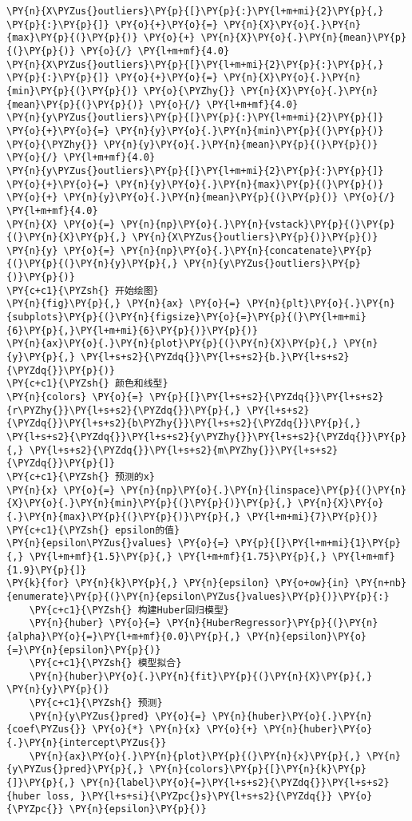 \begin{Verbatim}[commandchars=\\\{\}]
\PY{n}{X\PYZus{}outliers}\PY{p}{[}\PY{p}{:}\PY{l+m+mi}{2}\PY{p}{,} \PY{p}{:}\PY{p}{]} \PY{o}{+}\PY{o}{=} \PY{n}{X}\PY{o}{.}\PY{n}{max}\PY{p}{(}\PY{p}{)} \PY{o}{+} \PY{n}{X}\PY{o}{.}\PY{n}{mean}\PY{p}{(}\PY{p}{)} \PY{o}{/} \PY{l+m+mf}{4.0}
\PY{n}{X\PYZus{}outliers}\PY{p}{[}\PY{l+m+mi}{2}\PY{p}{:}\PY{p}{,} \PY{p}{:}\PY{p}{]} \PY{o}{+}\PY{o}{=} \PY{n}{X}\PY{o}{.}\PY{n}{min}\PY{p}{(}\PY{p}{)} \PY{o}{\PYZhy{}} \PY{n}{X}\PY{o}{.}\PY{n}{mean}\PY{p}{(}\PY{p}{)} \PY{o}{/} \PY{l+m+mf}{4.0}
\PY{n}{y\PYZus{}outliers}\PY{p}{[}\PY{p}{:}\PY{l+m+mi}{2}\PY{p}{]} \PY{o}{+}\PY{o}{=} \PY{n}{y}\PY{o}{.}\PY{n}{min}\PY{p}{(}\PY{p}{)} \PY{o}{\PYZhy{}} \PY{n}{y}\PY{o}{.}\PY{n}{mean}\PY{p}{(}\PY{p}{)} \PY{o}{/} \PY{l+m+mf}{4.0}
\PY{n}{y\PYZus{}outliers}\PY{p}{[}\PY{l+m+mi}{2}\PY{p}{:}\PY{p}{]} \PY{o}{+}\PY{o}{=} \PY{n}{y}\PY{o}{.}\PY{n}{max}\PY{p}{(}\PY{p}{)} \PY{o}{+} \PY{n}{y}\PY{o}{.}\PY{n}{mean}\PY{p}{(}\PY{p}{)} \PY{o}{/} \PY{l+m+mf}{4.0}
\PY{n}{X} \PY{o}{=} \PY{n}{np}\PY{o}{.}\PY{n}{vstack}\PY{p}{(}\PY{p}{(}\PY{n}{X}\PY{p}{,} \PY{n}{X\PYZus{}outliers}\PY{p}{)}\PY{p}{)}
\PY{n}{y} \PY{o}{=} \PY{n}{np}\PY{o}{.}\PY{n}{concatenate}\PY{p}{(}\PY{p}{(}\PY{n}{y}\PY{p}{,} \PY{n}{y\PYZus{}outliers}\PY{p}{)}\PY{p}{)}
\PY{c+c1}{\PYZsh{} 开始绘图}
\PY{n}{fig}\PY{p}{,} \PY{n}{ax} \PY{o}{=} \PY{n}{plt}\PY{o}{.}\PY{n}{subplots}\PY{p}{(}\PY{n}{figsize}\PY{o}{=}\PY{p}{(}\PY{l+m+mi}{6}\PY{p}{,}\PY{l+m+mi}{6}\PY{p}{)}\PY{p}{)}
\PY{n}{ax}\PY{o}{.}\PY{n}{plot}\PY{p}{(}\PY{n}{X}\PY{p}{,} \PY{n}{y}\PY{p}{,} \PY{l+s+s2}{\PYZdq{}}\PY{l+s+s2}{b.}\PY{l+s+s2}{\PYZdq{}}\PY{p}{)}
\PY{c+c1}{\PYZsh{} 颜色和线型}
\PY{n}{colors} \PY{o}{=} \PY{p}{[}\PY{l+s+s2}{\PYZdq{}}\PY{l+s+s2}{r\PYZhy{}}\PY{l+s+s2}{\PYZdq{}}\PY{p}{,} \PY{l+s+s2}{\PYZdq{}}\PY{l+s+s2}{b\PYZhy{}}\PY{l+s+s2}{\PYZdq{}}\PY{p}{,} \PY{l+s+s2}{\PYZdq{}}\PY{l+s+s2}{y\PYZhy{}}\PY{l+s+s2}{\PYZdq{}}\PY{p}{,} \PY{l+s+s2}{\PYZdq{}}\PY{l+s+s2}{m\PYZhy{}}\PY{l+s+s2}{\PYZdq{}}\PY{p}{]}
\PY{c+c1}{\PYZsh{} 预测的x}
\PY{n}{x} \PY{o}{=} \PY{n}{np}\PY{o}{.}\PY{n}{linspace}\PY{p}{(}\PY{n}{X}\PY{o}{.}\PY{n}{min}\PY{p}{(}\PY{p}{)}\PY{p}{,} \PY{n}{X}\PY{o}{.}\PY{n}{max}\PY{p}{(}\PY{p}{)}\PY{p}{,} \PY{l+m+mi}{7}\PY{p}{)}
\PY{c+c1}{\PYZsh{} epsilon的值}
\PY{n}{epsilon\PYZus{}values} \PY{o}{=} \PY{p}{[}\PY{l+m+mi}{1}\PY{p}{,} \PY{l+m+mf}{1.5}\PY{p}{,} \PY{l+m+mf}{1.75}\PY{p}{,} \PY{l+m+mf}{1.9}\PY{p}{]}
\PY{k}{for} \PY{n}{k}\PY{p}{,} \PY{n}{epsilon} \PY{o+ow}{in} \PY{n+nb}{enumerate}\PY{p}{(}\PY{n}{epsilon\PYZus{}values}\PY{p}{)}\PY{p}{:}
    \PY{c+c1}{\PYZsh{} 构建Huber回归模型}
    \PY{n}{huber} \PY{o}{=} \PY{n}{HuberRegressor}\PY{p}{(}\PY{n}{alpha}\PY{o}{=}\PY{l+m+mf}{0.0}\PY{p}{,} \PY{n}{epsilon}\PY{o}{=}\PY{n}{epsilon}\PY{p}{)}
    \PY{c+c1}{\PYZsh{} 模型拟合}
    \PY{n}{huber}\PY{o}{.}\PY{n}{fit}\PY{p}{(}\PY{n}{X}\PY{p}{,} \PY{n}{y}\PY{p}{)}
    \PY{c+c1}{\PYZsh{} 预测}
    \PY{n}{y\PYZus{}pred} \PY{o}{=} \PY{n}{huber}\PY{o}{.}\PY{n}{coef\PYZus{}} \PY{o}{*} \PY{n}{x} \PY{o}{+} \PY{n}{huber}\PY{o}{.}\PY{n}{intercept\PYZus{}}
    \PY{n}{ax}\PY{o}{.}\PY{n}{plot}\PY{p}{(}\PY{n}{x}\PY{p}{,} \PY{n}{y\PYZus{}pred}\PY{p}{,} \PY{n}{colors}\PY{p}{[}\PY{n}{k}\PY{p}{]}\PY{p}{,} \PY{n}{label}\PY{o}{=}\PY{l+s+s2}{\PYZdq{}}\PY{l+s+s2}{huber loss, }\PY{l+s+si}{\PYZpc{}s}\PY{l+s+s2}{\PYZdq{}} \PY{o}{\PYZpc{}} \PY{n}{epsilon}\PY{p}{)}


\end{Verbatim}
